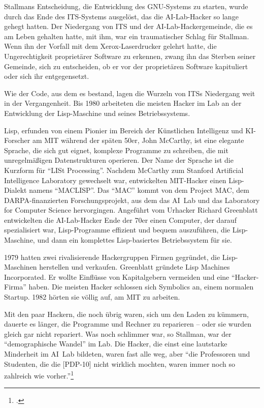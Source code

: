 Stallmans Entscheidung, die Entwicklung des GNU-Systems zu starten, wurde durch das Ende des ITS-Systems ausgelöst, das die AI-Lab-Hacker so lange gehegt hatten. Der Niedergang von ITS und der AI-Lab-Hackergemeinde, die es am Leben gehalten hatte, mit ihm, war ein traumatischer Schlag für Stallman. Wenn ihn der Vorfall mit dem Xerox-Laserdrucker gelehrt hatte, die Ungerechtigkeit proprietärer Software zu erkennen, zwang ihn das Sterben seiner Gemeinde, sich zu entscheiden, ob er vor der proprietären Software kapituliert oder sich ihr entgegensetzt.

Wie der Code, aus dem es bestand, lagen die Wurzeln von ITSs Niedergang weit in der Vergangenheit. Bis 1980 arbeiteten die meisten Hacker im Lab an der Entwicklung der Lisp-Maschine und seines Betriebssystems.

Lisp, erfunden von einem Pionier im Bereich der Künstlichen Intelligenz und KI-Forscher am MIT während der späten 50er, John McCarthy, ist eine elegante Sprache, die sich gut eignet, komplexe Programme zu schreiben, die mit unregelmäßigen Datenstrukturen operieren. Der Name der Sprache ist die Kurzform für "`LISt Processing"'. Nachdem McCarthy zum Stanford Artificial Intelligence Laboratory gewechselt war, entwickelten MIT-Hacker einen Lisp-Dialekt namens "`MACLISP"'. Das "`MAC"' kommt von dem Project MAC, dem DARPA-finanzierten Forschungsprojekt, aus dem das AI~Lab und das Laboratory for Computer Science hervorgingen. Angeführt vom Urhacker Richard Greenblatt entwickelten die AI-Lab-Hacker Ende der 70er einen Computer, der darauf spezialisiert war, Lisp-Programme effizient und bequem auszuführen, die Lisp-Maschine, und dann ein komplettes Lisp-basiertes Betriebssystem für sie.

1979 hatten zwei rivalisierende Hackergruppen Firmen gegründet, die Lisp-Maschinen herstellen und verkaufen. Greenblatt gründete Lisp Machines Incorporated. Er wollte Einflüsse von Kapitalgebern vermeiden und eine "`Hacker-Firma"' haben. Die meisten Hacker schlossen sich Symbolics an, einem normalen Startup. 1982 hörten sie völlig auf, am MIT zu arbeiten.

Mit den paar Hackern, die noch übrig waren, sich um den Laden zu kümmern, dauerte es länger, die Programme und Rechner zu reparieren – oder sie wurden gleich gar nicht repariert. Was noch schlimmer war, so Stallman, war der "`demographische Wandel"' im Lab. Die Hacker, die einst eine lautstarke Minderheit im AI~Lab bildeten, waren fast alle weg, aber "`die Professoren und Studenten, die die [PDP-10] nicht wirklich mochten, waren immer noch so zahlreich wie vorher."'\footcite{rmskth}

